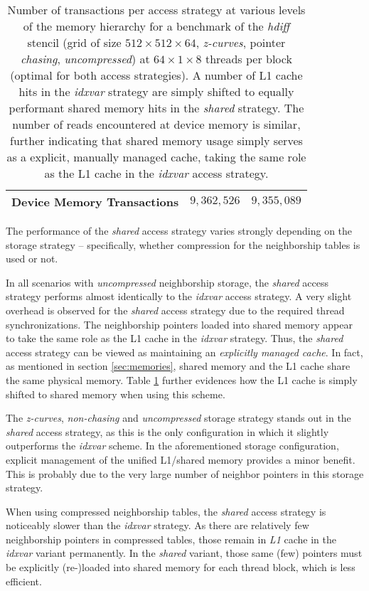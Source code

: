 \begin{table}
\begin{center}
\begin{tabular}{l l l}
        Device Memory Transactions & $9,362,526$ & $9,355,089$ \\
        \hline
    \end{tabular}
	\end{center}
    \caption{\label{tab:access-shared} Number of transactions per access strategy at various levels of the memory hierarchy for a benchmark of the \emph{hdiff} stencil (grid of size $512\times 512\times 64$, \emph{z-curves}, pointer \emph{chasing}, \emph{uncompressed}) at $64\times 1\times 8$ threads per block (optimal for both access strategies). A number of L1 cache hits in the \emph{idxvar} strategy are simply shifted to equally performant shared memory hits in the \emph{shared} strategy. The number of reads encountered at device memory is similar, further indicating that shared memory usage simply serves as a explicit, manually managed cache, taking the same role as the L1 cache in the \emph{idxvar} access strategy.}
\end{table}

The performance of the \emph{shared} access strategy varies strongly depending on the storage strategy -- specifically, whether compression for the neighborship tables is used or not.

In all scenarios with \emph{uncompressed} neighborship storage, the \emph{shared} access strategy performs almost identically to the \emph{idxvar} access strategy. A very slight overhead is observed for the \emph{shared} access strategy due to the required thread synchronizations. The neighborship pointers loaded into shared memory appear to take the same role as the L1 cache in the \emph{idxvar} strategy. Thus, the \emph{shared} access strategy can be viewed as maintaining an \emph{explicitly managed cache}. In fact, as mentioned in section \ref{sec:memories}, shared memory and the L1 cache share the same physical memory. Table \ref{tab:access-shared} further evidences how the L1 cache is simply shifted to shared memory when using this scheme.

The \emph{z-curves}, \emph{non-chasing} and \emph{uncompressed} storage strategy stands out in the \emph{shared} access strategy, as this is the only configuration in which it slightly outperforms the \emph{idxvar} scheme. In the aforementioned storage configuration, explicit management of the unified L1/shared memory provides a minor benefit. This is probably due to the very large number of neighbor pointers in this storage strategy.

When using compressed neighborship tables, the \emph{shared} access strategy is noticeably slower than the \emph{idxvar} strategy. As there are relatively few neighborship pointers in compressed tables, those remain in \emph{L1} cache in the \emph{idxvar} variant permanently. In the \emph{shared} variant, those same (few) pointers must be explicitly (re-)loaded into shared memory for each thread block, which is less efficient.

